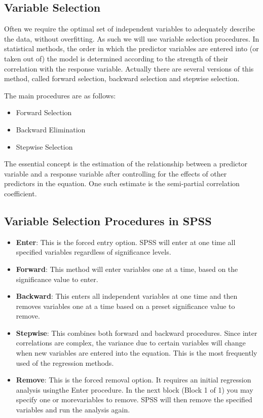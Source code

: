 \documentclass[a4paper,12pt]{article}
\begin{document}
\subsection{Variable Selection}
Often we require the optimal set of independent variables to adequately describe the data, without overfitting. As such we will use variable selection procedures. In statistical methods, the order in which the predictor variables are entered into (or taken out of) the model is determined according to the strength of their correlation with the response variable. Actually there are several versions of this method, called forward selection, backward selection and stepwise selection.

The main procedures are as follows:
\begin{itemize}
\item Forward Selection
\item Backward Elimination
\item Stepwise Selection
\end{itemize}

The essential concept is the estimation of the relationship between a predictor
variable and a response variable after controlling for the effects of other
predictors in the equation. One such estimate is the semi-partial correlation coefficient.

\subsection{Variable Selection Procedures in SPSS}

\begin{itemize}
\item \textbf{Enter}: This is the forced entry option. SPSS will enter at one time all specified variables regardless of significance levels.
\item \textbf{Forward}: This method will enter variables one at a time, based on the significance value to enter.
\item \textbf{Backward}: This enters all independent variables at one time and then removes variables one at a time based on a preset significance value to remove.
\item \textbf{Stepwise}: This combines both forward and backward procedures. Since inter correlations are complex, the variance due to certain variables will change when new variables are entered into the equation. This is the most frequently used of the regression methods.
\item \textbf{Remove}: This is the forced removal option. It requires an initial regression analysis usingthe Enter procedure. In the next block (Block 1 of 1) you may specify one or morevariables to remove. SPSS will then remove the specified variables and run the analysis again.
\end{itemize}
\end{document}
